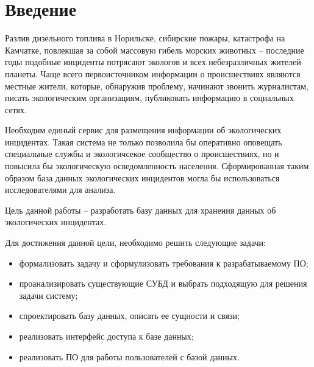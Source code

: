 \chapter*{Введение}
Разлив дизельного топлива в Норильске\cite{diesel}, сибирские пожары\cite{fires}, катастрофа на Камчатке\cite{kamchatka}, повлекшая за собой массовую гибель морских животных -- последние годы подобные инциденты потрясают экологов и всех небезразличных жителей планеты. Чаще всего первоисточником информации о происшествиях являются местные жители, которые, обнаружив проблему, начинают звонить журналистам, писать экологическим организациям, публиковать информацию в социальных сетях\cite{interview}.  

Необходим единый сервис для размещения информации об экологических инцидентах. Такая система не только позволила бы оперативно оповещать специальные службы и экологичсекое сообщество о происшествиях, но и повысила бы экологическую осведомленность населения. Сформированная таким образом база данных экологических инцидентов могла бы использоваться исследователями для анализа.  

Цель данной работы -- разработать базу данных для хранения данных об экологических инцидентах.

Для достижения данной цели, необходимо решить следующие задачи:
\begin{itemize}
	\item формализовать задачу и сформулизовать требования к разрабатываемому ПО;
	\item проанализировать существующие СУБД и выбрать подходящую для решения задачи систему;
	\item спроектировать базу данных, описать ее сущности и связи;
	\item реализовать интерфейс доступа к базе данных;
	\item реализовать ПО для работы пользователей с базой данных.
\end{itemize}  